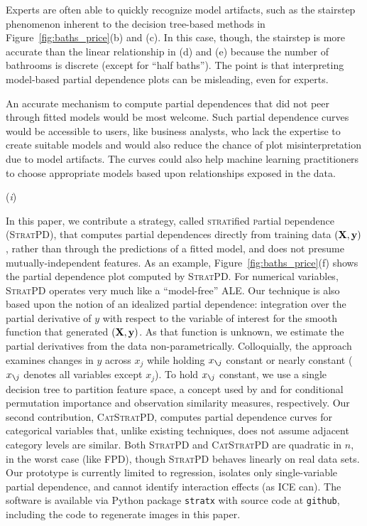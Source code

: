 \documentclass{article}
\newcommand{\figref}[1]{Figure~\ref{#1}}
\newcommand{\spd}{\fontfamily{cmr}\textsc{\small StratPD}}
\newcommand{\cspd}{\fontfamily{cmr}\textsc{\small CatStratPD}}
\newcommand{\xnj}{$x_{\texttt{\char`\\} j}$}
\begin{document}
Experts are often able to quickly recognize model artifacts, such as the stairstep phenomenon inherent to the decision tree-based methods in \figref{fig:baths_price}(b) and (c).  In this case, though, the stairstep is more accurate than the linear relationship in (d) and (e) because the number of bathrooms is discrete (except for ``half baths'').  The point is that interpreting model-based partial dependence plots can be misleading, even for experts. 

An accurate mechanism to compute partial dependences that did not peer through fitted models would be most welcome.  Such partial dependence curves would be accessible to users, like business analysts, who lack the expertise to create suitable models and would also reduce the chance of plot misinterpretation due to model artifacts. The curves could also help machine learning practitioners to choose appropriate models based upon relationships exposed in the data.

({\it i})

In this paper, we contribute a strategy, called {\textsc{strat}ified \textsc{p}artial \textsc{d}ependence} (\spd{}), that computes partial dependences directly from training data $({\bf X}, {\bf y})$, rather than through the predictions of a fitted model, and does not presume mutually-independent features. As an example, \figref{fig:baths_price}(f) shows the partial dependence plot computed by \spd.  For numerical variables, \spd{} operates very much like a ``model-free'' ALE.  Our technique is also based upon the notion of an idealized partial dependence:  integration over the partial derivative of $y$ with respect to the variable of interest for the smooth function that generated $({\bf X}, {\bf y})$. As that function is unknown, we estimate the partial derivatives from the data non-parametrically.  Colloquially, the approach examines changes in $y$ across $x_j$ while holding \xnj{} constant or nearly constant (\xnj{} denotes all variables except $x_j$).  To hold \xnj{} constant, we use a single decision tree to partition feature space, a concept used by \cite{rfimp} and \cite{RFunsup} for conditional permutation importance and observation similarity measures, respectively.  Our second contribution, \cspd{}, computes partial dependence curves for categorical variables that, unlike existing techniques, does not assume adjacent category levels are similar. Both \spd{} and \cspd{} are quadratic in $n$, in the worst case (like FPD), though \spd{} behaves linearly on real data sets.  Our prototype is currently limited to regression, isolates only single-variable partial dependence, and cannot identify interaction effects (as ICE can).  The software is available via Python package {\tt stratx} with source code at {\tt github}, including the code to regenerate images in this paper.
\end{document}
